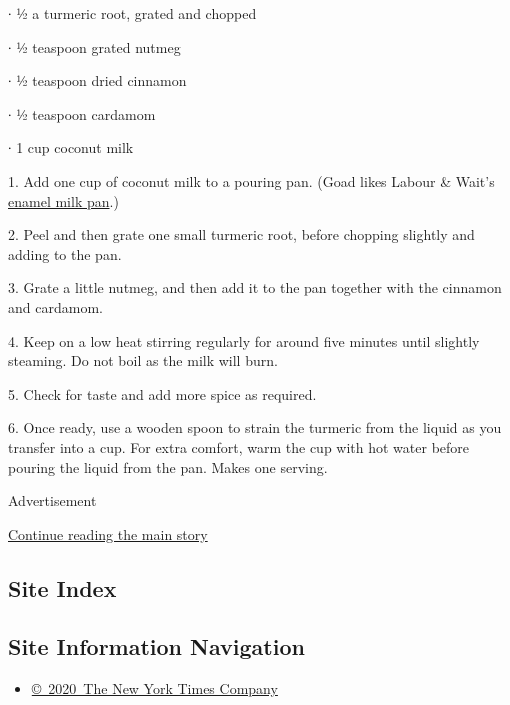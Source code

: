 ∙ ½ a turmeric root, grated and chopped

∙ ½ teaspoon grated nutmeg

∙ ½ teaspoon dried cinnamon

∙ ½ teaspoon cardamom

∙ 1 cup coconut milk

1. Add one cup of coconut milk to a pouring pan. (Goad likes Labour \&
Wait's
\href{https://www.labourandwait.co.uk/products/enamel-milk-pan}{enamel
milk pan}.)

2. Peel and then grate one small turmeric root, before chopping slightly
and adding to the pan.

3. Grate a little nutmeg, and then add it to the pan together with the
cinnamon and cardamom.

4. Keep on a low heat stirring regularly for around five minutes until
slightly steaming. Do not boil as the milk will burn.

5. Check for taste and add more spice as required.

6. Once ready, use a wooden spoon to strain the turmeric from the liquid
as you transfer into a cup. For extra comfort, warm the cup with hot
water before pouring the liquid from the pan. Makes one serving.

Advertisement

\protect\hyperlink{after-bottom}{Continue reading the main story}

\hypertarget{site-index}{%
\subsection{Site Index}\label{site-index}}

\hypertarget{site-information-navigation}{%
\subsection{Site Information
Navigation}\label{site-information-navigation}}

\begin{itemize}
\tightlist
\item
  \href{https://help.nytimes3xbfgragh.onion/hc/en-us/articles/115014792127-Copyright-notice}{©~2020~The
  New York Times Company}
\end{itemize}

